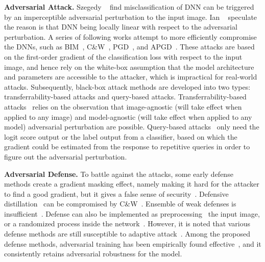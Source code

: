 \documentclass[10pt,twocolumn,letterpaper]{article}
\begin{document}
\textbf{Adversarial Attack.}
%
Szegedy \etal~\cite{l-bfgs} find misclassification of DNN can be triggered by
an imperceptible adversarial perturbation to the input image.
%
Ian \etal~\cite{fgsm} speculate the reason is that DNN being locally linear
with respect to the adversarial perturbation.
%
A series of following works attempt to more efficiently compromise the DNNs,
such as BIM~\cite{i-fgsm}, C\&W~\cite{cw}, PGD~\cite{madry}, and
APGD~\cite{apgd}.
%
These attacks are based on the first-order gradient of the classification loss
with respect to the input image, and hence rely on the white-box assumption
that the model architecture and parameters are accessible to the attacker,
which is impractical for real-world attacks.
%
Subsequently, black-box attack methods are developed into two types:
transferrability-based attacks and query-based attacks.
%
Transferrability-based attacks~\cite{di-fgsm,universal} relies on the observation that image-agnostic
(will take effect when applied to any image) and model-agnostic (will take
effect when applied to any model) adversarial perturbation are possible.
%
Query-based attacks~\cite{nes-atk,spsa-atk} only need the logit score output or the label output from a
classifier, based on which the gradient could be estimated from the response to
repetitive queries in order to figure out the adversarial perturbation.

\textbf{Adversarial Defense.}
%
To battle against the attacks, some early defense
methods create a gradient masking effect, namely making it hard for the attacker
to find a good gradient, but it gives a false sense of security~\cite{obfuscated}.
%
Defensive distillation~\cite{distill2} can be compromised by C\&W~\cite{cw}.
%
Ensemble of weak defenses is insufficient~\cite{ensembleweak}.
%
Defense can also be implemented as preprocessing~\cite{deflecting} the input
image, or a randomized process inside the network~\cite{self-ensemble}.
%
However, it is noted that various defense methods are still susceptible to
adaptive attack~\cite{adaptive}.
%
Among the proposed defense methods, adversarial training has been empirically
found effective~\cite{bilateral,advtrain-triplet,benchmarking}, and it consistently retains adversarial robustness
for the model.
\end{document}
